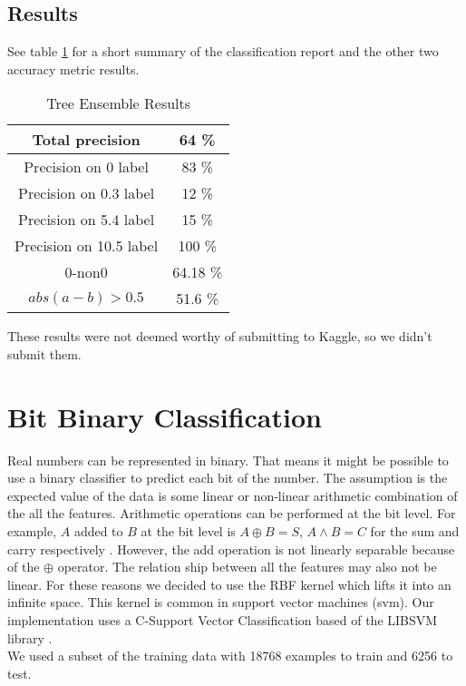 \documentclass[pdftex,a4paper,12pt]{article}
\begin{document}
\subsection{Results}
See table \ref{table:treeEnsembleReport} for a short summary of the classification report and the other two accuracy metric results. 
  \begin{table}[h]
        {\centering
          \begin{tabular}{|c|c|}
            \hline
             Total precision & 64 \% \\
            \hline
                Precision on 0 label &   83 \% \\
             \hline
                Precision on 0.3 label &   12 \%  \\
                \hline 
                Precision on 5.4 label &   15 \%  \\
                \hline
                Precision on 10.5 label &   100 \%  \\
                  \hline
                  \hline 
                  0-non0 & 64.18 \%\\
                  \hline
                 $abs(a - b) > 0.5$ & 51.6 \% \\
                  \hline
          \end{tabular}
          \caption{Tree Ensemble Results}          
          \label{table:treeEnsembleReport}}
  \end{table}
These results were not deemed worthy of submitting to Kaggle, so we didn't submit them.
  

\section{Bit Binary Classification}
Real numbers can be represented in binary.  That means it might be possible to use a binary classifier to predict each bit of the number.  The assumption is the expected value of the data is some linear or non-linear arithmetic combination of the all the features.  Arithmetic operations can be performed at the bit level.  For example, $A$ added to $B$ at the bit level is $A \oplus B = S$, $A \land B = C$ for the sum and carry respectively \cite{lancaster2001excel}.  However, the add operation is not linearly separable because of the $\oplus$ operator.  The relation ship between all the features may also not be linear.  For these reasons we decided to use the RBF kernel which lifts it into an infinite space. This kernel is common in support vector machines (svm).  Our implementation uses a C-Support Vector Classification based of the LIBSVM library \cite{LIBSVM}\cite{scikit-learn}.\\  We used a subset of the training data with 18768 examples to train and 6256 to test. 
\end{document}
